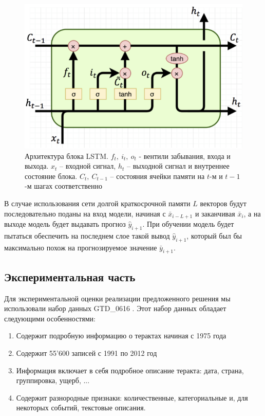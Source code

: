 \begin{figure}
  \centering
  \includegraphics[width=.7\linewidth]{images/lstm_arch.png}
  \caption{Архитектура блока LSTM. $f_t,\ i_t,\ o_t$ - вентили забывания, входа и выхода. $x_t$ -- входной сигнал, $h_t$ -- выходной сигнал и внутреннее состояние блока. $C_t,\ C_{t-1}$ -- состояния ячейки памяти на $t$-м и $t-1$-м шагах соответственно}
  \label{fig:lstm_arch}
\end{figure}


В случае использования сети долгой краткосрочной памяти $L$ векторов будут последовательно поданы на вход модели, начиная с  $\bar{x}_{i-L+1}$ и заканчивая $\bar{x}_{i}$, а на выходе модель будет выдавать прогноз $\hat{y}_{i+1}$. При обучении модель будет пытаться обеспечить на последнем слое такой вывод $\hat{y}_{i+1}$, который был бы максимально похож на прогнозируемое значение $\bar{y}_{i+1}$.

\subsection{Экспериментальная часть}
Для экспериментальной оценки реализации предложенного решения мы использовали набор данных GTD\_0616 \cite{db:gtd}.
Этот набор данных обладает следующими особенностями:
	\begin{enumerate}
		\item Содержит подробную информацию о терактах начиная с 1975 года
		\item Содержит 55'600 записей с 1991 по 2012 год
        \item Информация включает в себя подробное описание теракта: дата, страна, группировка, ущерб, ...
        \item Содержит разнородные признаки: количественные, категориальные и, для некоторых событий, текстовые описания.
	\end{enumerate}

